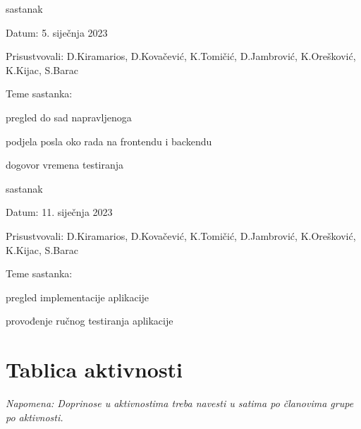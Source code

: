 \begin{packed_enum}
                \item  sastanak
			\item[] \begin{packed_item}
				\item Datum: 5. siječnja 2023
				\item Prisustvovali: D.Kiramarios, D.Kovačević, K.Tomičić, D.Jambrović, K.Orešković, K.Kijac, S.Barac
				\item Teme sastanka:
				\begin{packed_item}
					\item pregled do sad napravljenoga
            	    \item podjela posla oko rada na frontendu i backendu
                        \item dogovor vremena testiranja
				\end{packed_item}
			\end{packed_item}

                \item  sastanak
			\item[] \begin{packed_item}
				\item Datum: 11. siječnja 2023
				\item Prisustvovali: D.Kiramarios, D.Kovačević, K.Tomičić, D.Jambrović, K.Orešković, K.Kijac, S.Barac
				\item Teme sastanka:
				\begin{packed_item}
					\item pregled implementacije aplikacije
            	    \item provođenje ručnog testiranja aplikacije
				\end{packed_item}
			\end{packed_item}
			
		\end{packed_enum}
		
		\eject
		\section*{Tablica aktivnosti}
		
			
			 \textit{Napomena: Doprinose u aktivnostima treba navesti u satima po članovima grupe po aktivnosti.}

